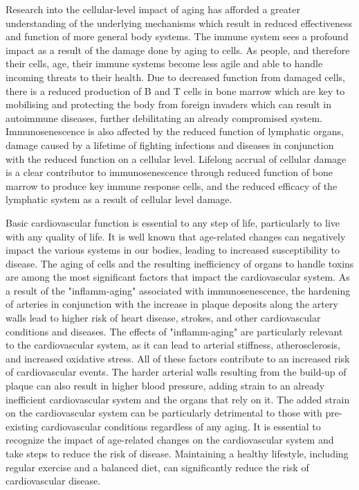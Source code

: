 \documentclass{article}
\begin{document}
Research into the cellular-level impact of aging has afforded a greater understanding of the underlying mechanisms which result in reduced effectiveness and function of more general body systems. The immune system sees a profound impact as a result of the damage done by aging to cells. As people, and therefore their cells, age, their immune systems become less agile and able to handle incoming threats to their health. Due to decreased function from damaged cells, there is a reduced production of B and T cells in bone marrow which are key to mobilising and protecting the body from foreign invaders which can result in autoimmune diseases, further debilitating an already compromised system. Immunosenescence is also affected by the reduced function of lymphatic organs, damage caused by a lifetime of fighting infections and diseases in conjunction with the reduced function on a cellular level. Lifelong accrual of cellular damage is a clear contributor to immunosenescence through reduced function of bone marrow to produce key immune response cells, and the reduced efficacy of the lymphatic system as a result of cellular level damage.


Basic cardiovascular function is essential to any step of life, particularly to live with any quality of life. It is well known that age-related changes can negatively impact the various systems in our bodies, leading to increased susceptibility to disease. The aging of cells and the resulting inefficiency of organs to handle toxins are among the most significant factors that impact the cardiovascular system. As a result of the "inflamm-aging" associated with immunosenescence, the hardening of arteries in conjunction with the increase in plaque deposits along the artery walls lead to higher risk of heart disease, strokes, and other cardiovascular conditions and diseases. The effects of "inflamm-aging" are particularly relevant to the cardiovascular system, as it can lead to arterial stiffness, atherosclerosis, and increased oxidative stress. All of these factors contribute to an increased risk of cardiovascular events. The harder arterial walls resulting from the build-up of plaque can also result in higher blood pressure, adding strain to an already inefficient cardiovascular system and the organs that rely on it. The added strain on the cardiovascular system can be particularly detrimental to those with pre-existing cardiovascular conditions regardless of any aging. It is essential to recognize the impact of age-related changes on the cardiovascular system and take steps to reduce the risk of disease. Maintaining a healthy lifestyle, including regular exercise and a balanced diet, can significantly reduce the risk of cardiovascular disease.
\end{document}
